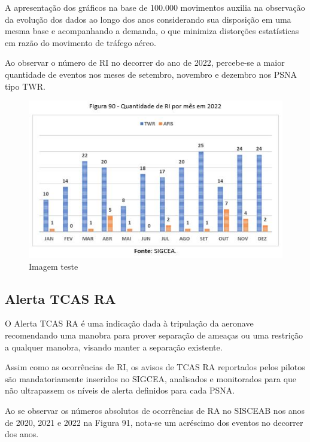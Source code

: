 \documentclass[
]{book}
\begin{document}
A apresentação dos gráficos na base de 100.000 movimentos auxilia na observação da evolução dos dados ao longo dos anos considerando sua disposição em uma mesma base e acompanhando a demanda, o que minimiza distorções estatísticas em razão do movimento de tráfego aéreo.

Ao observar o número de RI no decorrer do ano de 2022, percebe-se a maior quantidade de eventos nos meses de setembro, novembro e dezembro nos PSNA tipo TWR.

\begin{figure}
\centering
\includegraphics{imagens/fig77.jpg}
\caption{Imagem teste}
\end{figure}

\hypertarget{alerta-tcas-ra}{%
\subsection{Alerta TCAS RA}\label{alerta-tcas-ra}}

O Alerta TCAS RA é uma indicação dada à tripulação da aeronave recomendando uma manobra para prover separação de ameaças ou uma restrição a qualquer manobra, visando manter a separação existente.

Assim como as ocorrências de RI, os avisos de TCAS RA reportados pelos pilotos são mandatoriamente inseridos no SIGCEA, analisados e monitorados para que não ultrapassem os níveis de alerta definidos para cada PSNA.

Ao se observar os números absolutos de ocorrências de RA no SISCEAB nos anos de 2020, 2021 e 2022 na Figura 91, nota-se um acréscimo dos eventos no decorrer dos anos.
\end{document}

